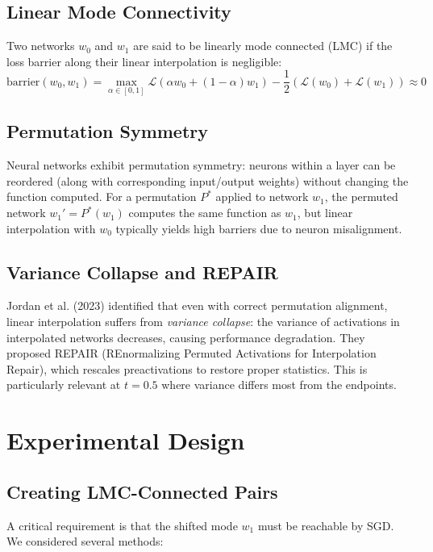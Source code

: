 \documentclass[11pt,a4paper]{article}
\begin{document}
\subsection{Linear Mode Connectivity}

Two networks $w_0$ and $w_1$ are said to be linearly mode connected (LMC) if the loss barrier along their linear interpolation is negligible:
\begin{equation}
    \text{barrier}(w_0, w_1) = \max_{\alpha \in [0,1]} \mathcal{L}(\alpha w_0 + (1-\alpha) w_1) - \frac{1}{2}(\mathcal{L}(w_0) + \mathcal{L}(w_1)) \approx 0
\end{equation}

\subsection{Permutation Symmetry}

Neural networks exhibit permutation symmetry: neurons within a layer can be reordered (along with corresponding input/output weights) without changing the function computed. For a permutation $P^*$ applied to network $w_1$, the permuted network $w_1' = P^*(w_1)$ computes the same function as $w_1$, but linear interpolation with $w_0$ typically yields high barriers due to neuron misalignment.

\subsection{Variance Collapse and REPAIR}

Jordan et al. (2023) identified that even with correct permutation alignment, linear interpolation suffers from \textit{variance collapse}: the variance of activations in interpolated networks decreases, causing performance degradation. They proposed REPAIR (REnormalizing Permuted Activations for Interpolation Repair), which rescales preactivations to restore proper statistics. This is particularly relevant at $t=0.5$ where variance differs most from the endpoints.


\section{Experimental Design}

\subsection{Creating LMC-Connected Pairs}

A critical requirement is that the shifted mode $w_1$ must be reachable by SGD. We considered several methods:
\end{document}
